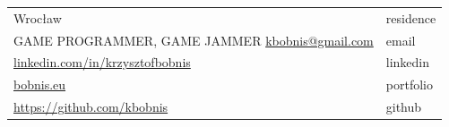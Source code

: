 \documentclass[12pt,a4paper]{article}
\begin{document}
\begin{tabular}  { >{\RaggedLeft} p{16cm}  p{3cm} }  
	{\Large \textbf{KRZYSZTOF BOBNIS}} \hfill Wrocław & \textcolor{techColor}{residence} \\
	 GAME PROGRAMMER, GAME JAMMER \hfill  {\href{mailto:kbobnis@gmail.com}{kbobnis@gmail.com}} & \textcolor{techColor}{email} \\ 
	 \hfill {\href{https://www.linkedin.com/in/krzysztofbobnis}{linkedin.com/in/krzysztofbobnis}} & \textcolor{techColor}{linkedin} \\
	 \hfill {\href{http://bobnis.eu}{bobnis.eu}} & \textcolor{techColor}{portfolio} \\
	 \hfill {\href{https://github.com/kbobnis}{https://github.com/kbobnis}} & \textcolor{techColor}{github} \\
\end{tabular}	 

\vspace{0.5cm}
\end{document}
